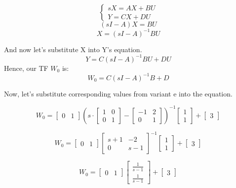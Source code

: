 \documentclass{article}
\begin{document}
        $$\left\{ \begin{array}{ll} 
                sX = AX + BU\\
                Y = CX + DU
            \end{array} \right.$$
        $$(sI-A)X = BU$$
        $$X = (sI-A)^{-1}BU$$
        
        And now let's substitute X into Y's equation.
        $$Y = C(sI-A)^{-1}BU + DU$$
        Hence, our TF $W_0$ is:
        $$W_0 = C(sI-A)^{-1}B + D$$
 
        Now, let's substitute corresponding values from variant e into the equation.
        
        $$W_0 = 
            \begin{bmatrix}
                0 & 1
            \end{bmatrix} (s \cdot
            \begin{bmatrix}
                1 & 0\\
                0 & 1
            \end{bmatrix} - 
            \begin{bmatrix}
                -1 & 2\\
                0 & 1
            \end{bmatrix})^{-1}
            \begin{bmatrix}
                1\\
                1
            \end{bmatrix} + 
            \begin{bmatrix}
                3
            \end{bmatrix}$$
       
        $$W_0 = 
            \begin{bmatrix}
                0 & 1
            \end{bmatrix}
            \begin{bmatrix}
                s+1 & -2\\
                0 & s-1
            \end{bmatrix}^{-1}
            \begin{bmatrix}
                1\\
                1
            \end{bmatrix} + 
            \begin{bmatrix}
                3
            \end{bmatrix}$$
            
            
        $$W_0 = 
            \begin{bmatrix}
                0 & 1
            \end{bmatrix}
            \begin{bmatrix}
                \frac{1}{s-1}\\
                \frac{1}{s-1}
            \end{bmatrix} + 
            \begin{bmatrix}
                3
            \end{bmatrix}$$
            
\end{document}
